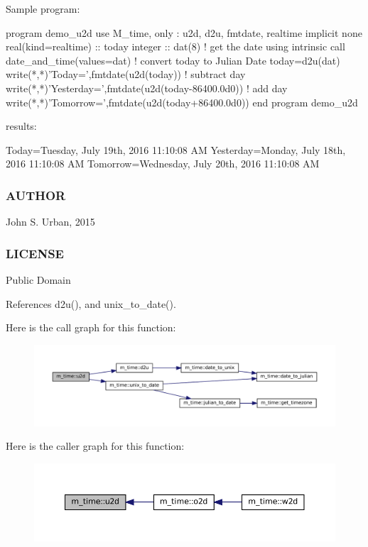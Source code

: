 \begin{DoxyVerb}Sample program:

 program demo_u2d
 use M_time, only : u2d, d2u, fmtdate, realtime
 implicit none
 real(kind=realtime) :: today
 integer :: dat(8)
    ! get the date using intrinsic
    call date_and_time(values=dat)
    ! convert today to Julian Date
    today=d2u(dat)
    write(*,*)'Today=',fmtdate(u2d(today))
    ! subtract day
    write(*,*)'Yesterday=',fmtdate(u2d(today-86400.0d0))
    ! add day
    write(*,*)'Tomorrow=',fmtdate(u2d(today+86400.0d0))
 end program demo_u2d

results:

 Today=Tuesday, July 19th, 2016 11:10:08 AM
 Yesterday=Monday, July 18th, 2016 11:10:08 AM
 Tomorrow=Wednesday, July 20th, 2016 11:10:08 AM
\end{DoxyVerb}


\subsubsection*{A\+U\+T\+H\+OR}

John S. Urban, 2015 \subsubsection*{L\+I\+C\+E\+N\+SE}

Public Domain 

References d2u(), and unix\+\_\+to\+\_\+date().

Here is the call graph for this function\+:\nopagebreak
\begin{figure}[H]
\begin{center}
\leavevmode
\includegraphics[width=350pt]{namespacem__time_a083bc231f8ba1879d7f86ab424e77d6c_cgraph}
\end{center}
\end{figure}
Here is the caller graph for this function\+:\nopagebreak
\begin{figure}[H]
\begin{center}
\leavevmode
\includegraphics[width=350pt]{namespacem__time_a083bc231f8ba1879d7f86ab424e77d6c_icgraph}
\end{center}
\end{figure}
\mbox{\label{namespacem__time_acc62ada23f8fa2fe67b428702fbcbf1c}} 
